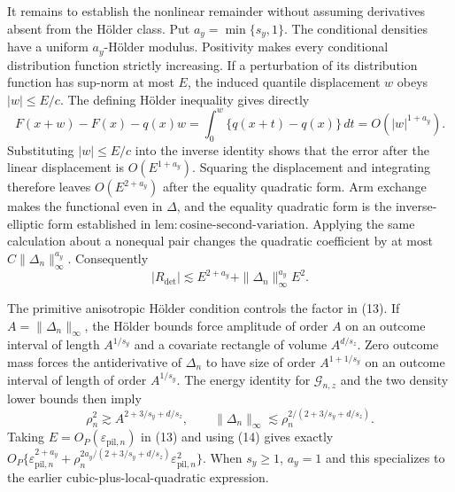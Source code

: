 It remains to establish the nonlinear remainder without assuming derivatives absent from the H\"older class.  Put \(a_y=\min\{s_y,1\}\).  The conditional densities have a uniform \(a_y\)-H\"older modulus.  Positivity makes every conditional distribution function strictly increasing.  If a perturbation of its distribution function has sup-norm at most \(E\), the induced quantile displacement \(w\) obeys \(|w|\le E/c\).  The defining H\"older inequality gives directly
\[
F(x+w)-F(x)-q(x)w
=\int_0^w\{q(x+t)-q(x)\}\,dt
=O(|w|^{1+a_y}).
\]
Substituting \(|w|\le E/c\) into the inverse identity shows that the error after the linear displacement is \(O(E^{1+a_y})\).  Squaring the displacement and integrating therefore leaves \(O(E^{2+a_y})\) after the equality quadratic form.  Arm exchange makes the functional even in \(\Delta\), and the equality quadratic form is the inverse-elliptic form established in \(\mathrm{lem{:}cosine\text{-}second\text{-}variation}\).  Applying the same calculation about a nonequal pair changes the quadratic coefficient by at most \(C\|\Delta_n\|_\infty^{a_y}\).  Consequently
\[
|R_{\mathrm{det}}|
\lesssim E^{2+a_y}+\|\Delta_n\|_\infty^{a_y}E^2.                        \tag{13}
\]

The primitive anisotropic H\"older condition controls the factor in (13).  If \(A=\|\Delta_n\|_\infty\), the H\"older bounds force amplitude of order \(A\) on an outcome interval of length \(A^{1/s_y}\) and a covariate rectangle of volume \(A^{d/s_z}\).  Zero outcome mass forces the antiderivative of \(\Delta_n\) to have size of order \(A^{1+1/s_y}\) on an outcome interval of length of order \(A^{1/s_y}\).  The energy identity for \(\mathcal G_{n,z}\) and the two density lower bounds then imply
\[
\rho_n^2\gtrsim A^{2+3/s_y+d/s_z},
\qquad
\|\Delta_n\|_\infty\lesssim\rho_n^{2/(2+3/s_y+d/s_z)}.               \tag{14}
\]
Taking \(E=O_P(\varepsilon_{\mathrm{pil},n})\) in (13) and using (14) gives exactly \(O_P\{\varepsilon_{\mathrm{pil},n}^{2+a_y}+\rho_n^{2a_y/(2+3/s_y+d/s_z)}\varepsilon_{\mathrm{pil},n}^2\}\).  When \(s_y\ge1\), \(a_y=1\) and this specializes to the earlier cubic-plus-local-quadratic expression.

